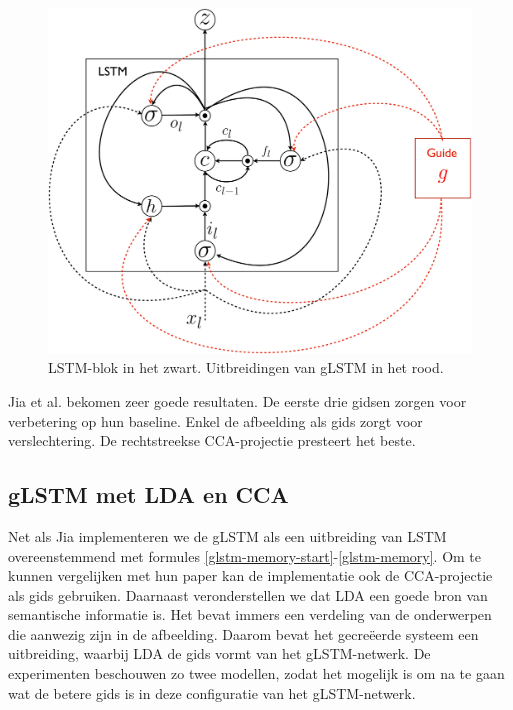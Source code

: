 \begin{figure}[tb][h]
	\centering
	\includegraphics[width=\linewidth]{Images/glstm.pdf}
	\caption{LSTM-blok in het zwart. Uitbreidingen van gLSTM in het rood.}
	\label{fig:glstm}
\end{figure}

Jia et al. bekomen zeer goede resultaten. De eerste drie gidsen zorgen voor verbetering op hun baseline. Enkel de afbeelding als gids zorgt voor verslechtering. De rechtstreekse CCA-projectie presteert het beste.

\subsection{gLSTM met LDA en CCA}
Net als Jia implementeren we de gLSTM als een uitbreiding van LSTM overeenstemmend met formules \ref{glstm-memory-start}-\ref{glstm-memory}.
Om te kunnen vergelijken met hun paper kan de implementatie ook de CCA-projectie als gids gebruiken.
Daarnaast veronderstellen we dat LDA een goede bron van semantische informatie is. Het bevat immers een verdeling van de onderwerpen die aanwezig zijn in de afbeelding. Daarom bevat het gecre\"eerde systeem een uitbreiding, waarbij LDA de gids vormt van het gLSTM-netwerk.
De experimenten beschouwen zo twee modellen, zodat het mogelijk is om na te gaan wat de betere gids is in deze configuratie van het gLSTM-netwerk.

